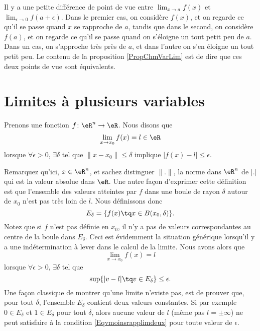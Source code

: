 Il y a une petite différence de point de vue entre $\lim_{x\to a}f(x)$ et $\lim_{\epsilon\to 0}f(a+\epsilon)$. Dans le premier cas, on considère $f(x)$, et on regarde ce qu'il se passe quand $x$ se rapproche de $a$, tandis que dans le second, on considère $f(a)$, et on regarde ce qu'il se passe quand on s'éloigne un tout petit peu de $a$. Dans un cas, on s'approche très près de $a$, et dans l'autre on s'en éloigne un tout petit peu. Le contenu de la proposition \ref{PropChmVarLim} est de dire que ces deux points de vue sont équivalents.


\section{Limites à plusieurs variables}
\label{SecLimVarsPlus}

Prenons une fonction $f\colon \eR^n\to \eR$. Nous disons que
\begin{equation}
    \lim_{x\to x_0}f(x)=l\in\eR
\end{equation}
lorsque $\forall \epsilon>0$, $\exists\delta$ tel que $\| x-x_0 \|\leq\delta$ implique $| f(x)-l |\leq \epsilon$. 

Remarquez qu'ici, $x\in\eR^n$, et sachez distinguer $\| . \|$, la norme dans $\eR^n$ de $| . |$ qui est la valeur absolue dans $\eR$. Une autre façon d'exprimer cette définition est que l'ensemble des valeurs atteintes par $f$ dans une boule de rayon $\delta$ autour de $x_0$ n'est pas très loin de $l$. Nous définissons donc
\begin{equation}
    E_{\delta}=\{ f(x)\tq x\in B(x_0,\delta) \}.
\end{equation}
Notez que si $f$ n'est pas définie en $x_0$, il n'y a pas de valeurs correspondantes au centre de la boule dans $E_{\delta}$. Ceci est évidemment la situation générique lorsqu'il y a une indétermination à lever dans le calcul de la limite. Nous avons alors que
\begin{equation}
    \lim_{x\to x_0}f(x)=l
\end{equation}
lorsque $\forall\epsilon>0$, $\exists\delta$ tel que 
\begin{equation}        \label{Eqvmoinsrapplimdeux}
    \sup\{ | v-l |\tq v\in E_{\delta} \}\leq\epsilon.
\end{equation}
Une façon classique de montrer qu'une limite n'existe pas, est de prouver que, pour tout $\delta$, l'ensemble $E_{\delta}$ contient deux valeurs constantes. Si par exemple $0\in E_{\delta}$ et $1\in E_{\delta}$ pour tout $\delta$, alors aucune valeur de $l$ (même pas $l=\pm\infty$) ne peut satisfaire à la condition \eqref{Eqvmoinsrapplimdeux} pour toute valeur de $\epsilon$.

